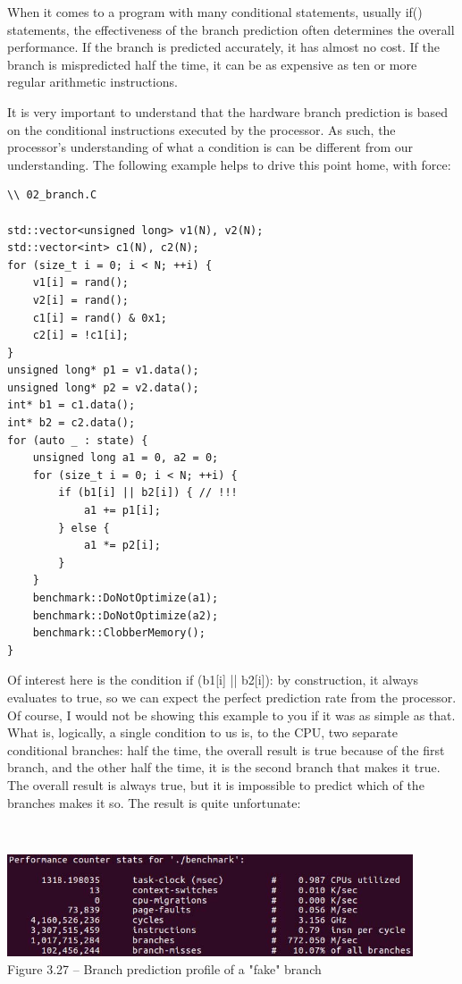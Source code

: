When it comes to a program with many conditional statements, usually if() statements, the effectiveness of the branch prediction often determines the overall performance. If the branch is predicted accurately, it has almost no cost. If the branch is mispredicted half the time, it can be as expensive as ten or more regular arithmetic instructions.

It is very important to understand that the hardware branch prediction is based on the conditional instructions executed by the processor. As such, the processor's understanding of what a condition is can be different from our understanding. The following example helps to drive this point home, with force:

\begin{lstlisting}[style=styleCXX]
\\ 02_branch.C

std::vector<unsigned long> v1(N), v2(N);
std::vector<int> c1(N), c2(N);
for (size_t i = 0; i < N; ++i) {
	v1[i] = rand();
	v2[i] = rand();
	c1[i] = rand() & 0x1;
	c2[i] = !c1[i];
}
unsigned long* p1 = v1.data();
unsigned long* p2 = v2.data();
int* b1 = c1.data();
int* b2 = c2.data();
for (auto _ : state) {
	unsigned long a1 = 0, a2 = 0;
	for (size_t i = 0; i < N; ++i) {
		if (b1[i] || b2[i]) { // !!!
			a1 += p1[i];
		} else {
			a1 *= p2[i];
		}
	}
	benchmark::DoNotOptimize(a1);
	benchmark::DoNotOptimize(a2);
	benchmark::ClobberMemory();
}
\end{lstlisting}

Of interest here is the condition if (b1[i] || b2[i]): by construction, it always evaluates to true, so we can expect the perfect prediction rate from the processor. Of course, I would not be showing this example to you if it was as simple as that. What is, logically, a single condition to us is, to the CPU, two separate conditional branches: half the time, the overall result is true because of the first branch, and the other half the time, it is the second branch that makes it true. The overall result is always true, but it is impossible to predict which of the branches makes it so. The result is quite unfortunate:

\hspace*{\fill} \\ %
\begin{center}
\includegraphics[width=0.9\textwidth]{content/1/chapter3/images/27.jpg}\\
Figure 3.27 – Branch prediction profile of a "fake" branch
\end{center}

